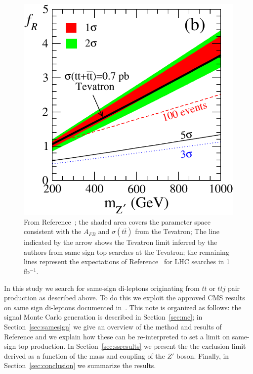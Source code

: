 \begin{figure}[htb]
\begin{center}
\includegraphics[width=0.6\linewidth]{figs/berger_limit.pdf}
\caption{\protect From Reference~\cite{berger}; the shaded area covers the parameter
space consistent with the $A_{FB}$ and $\sigma(t\bar{t})$ from the Tevatron;
The line indicated by the arrow shows the Tevatron limit inferred by the authors
from same sign top searches at the Tevatron; the remaining lines represent the
expectations of Reference~\cite{berger}
for LHC searches in 1 fb$^{-1}$. \label{fig:berger_limit}}
\end{center}
\end{figure}




In this study we search for same-sign di-leptons originating from $tt$ 
or $ttj$ pair production as described above.
To do this we exploit the approved CMS results on same sign di-leptons documented in~\cite{ssnote1, sspaper}.
This note is organized as follows: 
the signal Monte Carlo generation is described in Section~\ref{sec:mc};
in Section~\ref{sec:samesign} we give an overview of the method and results of Reference \cite{sspaper}
and we explain how these can be re-interpreted to set a limit on same-sign top production.
In Section~\ref{sec:ssresults} we present the the exclusion limit derived 
as a function of the mass and coupling of the $Z'$ boson.
Finally, in Section~\ref{sec:conclusion} we summarize the results.  






